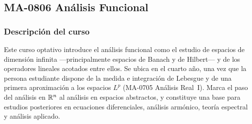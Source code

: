 \newpage
\subsection*{MA-0806 Análisis Funcional}

\hypertarget{MA0806}{}
\begin{refsection}
\begin{table}[H]
\end{table}

\subsubsection*{Descripción del curso}

Este curso optativo introduce el análisis funcional como el estudio de espacios de dimensión infinita ---principalmente espacios de Banach y de Hilbert--- y de los operadores lineales acotados entre ellos. Se ubica en el cuarto año, una vez que la persona estudiante dispone de la medida e integración de Lebesgue y de una primera aproximación a los espacios $L^p$ (MA-0705 Análisis Real~I). Marca el paso del análisis en $\mathbb{R}^n$ al análisis en espacios abstractos, y constituye una base para estudios posteriores en ecuaciones diferenciales, análisis armónico, teoría espectral y análisis aplicado.


\end{refsection}
